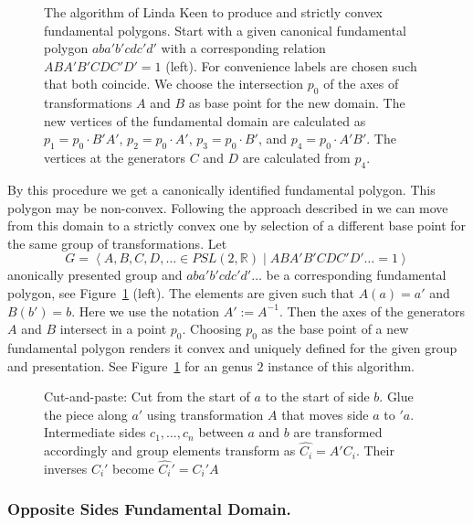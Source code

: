 \documentclass[Thesis]{subfiles}
\begin{document}
\begin{figure}
\centering
{}
\caption{The algorithm of Linda Keen to produce and strictly convex fundamental polygons. Start with a given canonical fundamental polygon $aba'b'cdc'd'$ with a corresponding relation $ABA'B'CDC'D'=1$ (left). For convenience labels are chosen such that both coincide. We choose the intersection $p_0$ of the axes of transformations $A$ and $B$ as base point for the new domain. The new vertices of the fundamental domain are calculated as $p_1=p_0\cdot B'A'$, $p_2=p_0\cdot A'$, $p_3=p_0\cdot B'$, and $p_4=p_0\cdot A'B'$. The vertices at the generators $C$ and $D$ are calculated from $p_4$.}
\label{fig:keen_polygon}
\end{figure}

By this procedure we get a canonically identified fundamental polygon. This polygon may be non-convex. Following the approach described in \cite{keen1966} we can move from this domain to a strictly convex one by selection of a different base point for the same group of transformations. Let
\[G=\left<A,B,C,D,\ldots\in \mathit{PSL}(2,\mathbb R)\mid ABA'B'CDC'D'\ldots=1\right>\]
anonically presented group and $aba'b'cdc'd'\ldots$ be a corresponding fundamental polygon, see Figure~\ref{fig:keen_polygon} (left). The elements are given such that $A(a)=a'$ and $B(b')=b$. Here we use the notation $A':=A^{-1}$. Then the axes of the generators $A$ and $B$ intersect in a point $p_0$. Choosing $p_0$ as the base point of a new fundamental polygon renders it convex and uniquely defined for the given group and presentation. See Figure~\ref{fig:keen_polygon} for an genus $2$ instance of this algorithm.

\begin{figure}
\centering
\resizebox{0.5\textwidth}{!} {

}
\caption{Cut-and-paste: Cut from the start of $a$ to the start of side $b$. Glue the piece along $a'$ using transformation $A$ that moves side $a$ to $'a$. Intermediate sides $c_1,\ldots,c_n$ between $a$ and $b$ are transformed accordingly and group elements transform as $\hat{C_i}=A'C_i$. Their inverses $C_i'$ become $\hat{C_i}'=C_i'A$}
\label{fig:cut-and-paste-canonical}
\end{figure}

\subsubsection*{Opposite Sides Fundamental Domain.}
\end{document}
